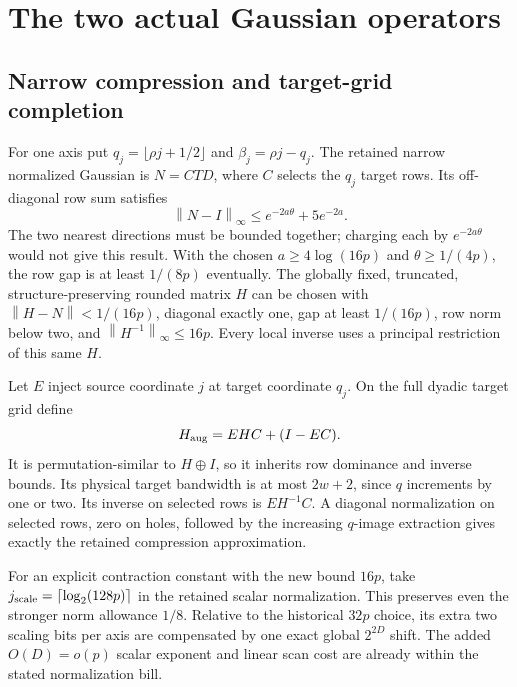 \documentclass[11pt]{article}
\newcommand{\norm}[1]{\left\lVert #1\right\rVert}
\begin{document}
\section{The two actual Gaussian operators}

\subsection{Narrow compression and target-grid completion}
For one axis put $q_j=\lfloor\rho j+1/2\rfloor$ and $\beta_j=\rho j-q_j$. The retained narrow normalized Gaussian is $N=CTD$, where $C$ selects the $q_j$ target rows. Its off-diagonal row sum satisfies
\[
 \norm{N-I}_\infty\leq e^{-2a\theta}+5e^{-2a}.
\]
The two nearest directions must be bounded together; charging each by $e^{-2a\theta}$ would not give this result. With the chosen $a\geq4\log(16p)$ and $\theta\geq1/(4p)$, the row gap is at least $1/(8p)$ eventually. The globally fixed, truncated, structure-preserving rounded matrix $H$ can be chosen with $\norm{H-N}<1/(16p)$, diagonal exactly one, gap at least $1/(16p)$, row norm below two, and $\norm{H^{-1}}_\infty\leq16p$. Every local inverse uses a principal restriction of this same $H$.

Let $E$ inject source coordinate $j$ at target coordinate $q_j$. On the full dyadic target grid define
\[
 H_{\rm aug}=EHC+(I-EC).
\]
It is permutation-similar to $H\oplus I$, so it inherits row dominance and inverse bounds. Its physical target bandwidth is at most $2w+2$, since $q$ increments by one or two. Its inverse on selected rows is $EH^{-1}C$. A diagonal normalization on selected rows, zero on holes, followed by the increasing $q$-image extraction gives exactly the retained compression approximation.

For an explicit contraction constant with the new bound $16p$, take
$j_{\rm scale}=\lceil\log_2(128p)\rceil$ in the retained scalar normalization.
This preserves even the stronger norm allowance $1/8$. Relative to the
historical $32p$ choice, its extra two scaling bits per axis are compensated
by one exact global $2^{2D}$ shift. The added $O(D)=o(p)$ scalar exponent
and linear scan cost are already within the stated normalization bill.
\end{document}
